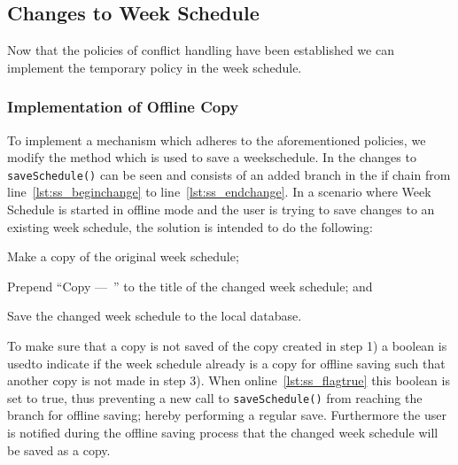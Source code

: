 \subsection{Changes to Week Schedule}
Now that the policies of conflict handling have been established we can implement the temporary policy in the week schedule.

\subsubsection{Implementation of Offline Copy}
To implement a mechanism which adheres to the aforementioned policies, we modify the method which is used to save a weekschedule.
In  the changes to \texttt{saveSchedule()} can be seen and consists of an added branch in the if chain from line~\ref{lst:ss_beginchange} to line~\ref{lst:ss_endchange}.
In a scenario where Week Schedule is started in offline mode and the user is trying to save changes to an existing week schedule, the solution is intended to do the following: 
\begin{enumberate}
\item Make a copy of the original week schedule;
\item Prepend \enquote{Copy ---~} to the title of the changed week schedule; and
\item Save the changed week schedule to the local database.  
\end{enumberate}

To make sure that a copy is not saved of the copy created in step 1) a boolean is usedto indicate if the week schedule already is a copy for offline saving such that another copy is not made in step 3).
When online~\ref{lst:ss_flagtrue} this boolean is set to true, thus preventing a new call to \texttt{saveSchedule()} from reaching the branch for offline saving; hereby performing a regular save.
Furthermore the user is notified during the offline saving process that the changed week schedule will be saved as a copy.


